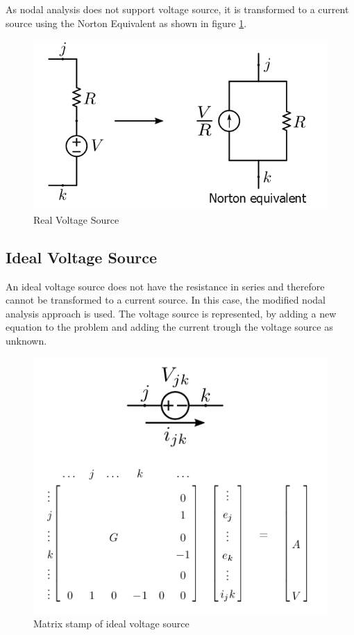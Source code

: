As nodal analysis does not support voltage source, it is transformed to a current source using the Norton Equivalent as shown in figure \ref{fig:Real_Voltage_Source}.

\begin{figure}[ht]
	\centering
	\includegraphics[scale=0.5]{img/VoltageSourceRes.png} 
	\caption{Real Voltage Source}
	\label{fig:Real_Voltage_Source}
\end{figure}

\subsection{Ideal Voltage Source}
An ideal voltage source does not have the resistance in series and therefore cannot be transformed to a current source. In this case, the modified nodal analysis approach is used. The voltage source is represented, by adding a new equation to the problem and adding the current trough the voltage source as unknown. 

\begin{figure}
	\centering
	\includegraphics[scale=0.6]{img/IdealVoltageSource.png}
	\caption{Matrix stamp of ideal voltage source}
	\label{fig:Ideal_Voltage_Source}
\end{figure}

